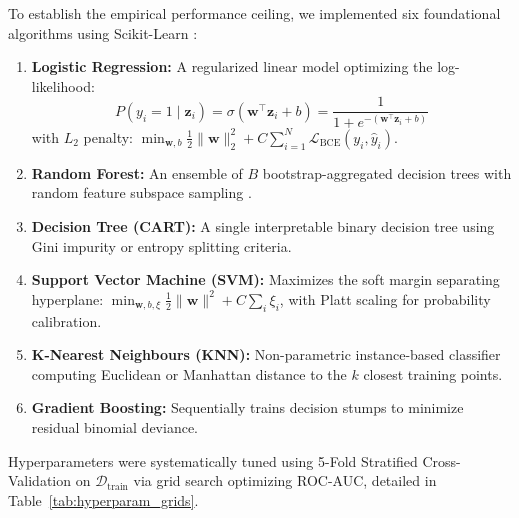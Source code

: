 To establish the empirical performance ceiling, we implemented six foundational algorithms using Scikit-Learn \citep{pedregosa2011scikit}:
\begin{enumerate}
    \item \textbf{Logistic Regression:} A regularized linear model optimizing the log-likelihood:
    \begin{equation}
    P(y_i=1 \mid \mathbf{z}_i) = \sigma(\mathbf{w}^\top \mathbf{z}_i + b) = \frac{1}{1 + e^{-(\mathbf{w}^\top \mathbf{z}_i + b)}}
    \end{equation}
    with $L_2$ penalty: $\min_{\mathbf{w}, b} \frac{1}{2} \|\mathbf{w}\|_2^2 + C \sum_{i=1}^{N} \mathcal{L}_{\text{BCE}}(y_i, \hat{y}_i)$.
    \item \textbf{Random Forest:} An ensemble of $B$ bootstrap-aggregated decision trees with random feature subspace sampling \citep{breiman2001random}.
    \item \textbf{Decision Tree (CART):} A single interpretable binary decision tree using Gini impurity or entropy splitting criteria.
    \item \textbf{Support Vector Machine (SVM):} Maximizes the soft margin separating hyperplane: $\min_{\mathbf{w}, b, \xi} \frac{1}{2} \|\mathbf{w}\|^2 + C \sum_{i} \xi_i$, with Platt scaling for probability calibration.
    \item \textbf{K-Nearest Neighbours (KNN):} Non-parametric instance-based classifier computing Euclidean or Manhattan distance to the $k$ closest training points.
    \item \textbf{Gradient Boosting:} Sequentially trains decision stumps to minimize residual binomial deviance.
\end{enumerate}

Hyperparameters were systematically tuned using 5-Fold Stratified Cross-Validation on $\mathcal{D}_{\text{train}}$ via grid search optimizing ROC-AUC, detailed in Table~\ref{tab:hyperparam_grids}.

